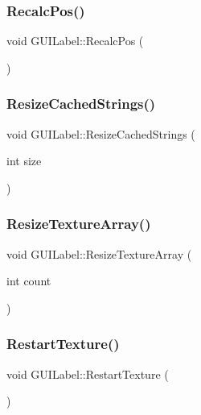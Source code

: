 \subsubsection{\texorpdfstring{Recalc\+Pos()}{RecalcPos()}}
{\footnotesize\ttfamily void G\+U\+I\+Label\+::\+Recalc\+Pos (\begin{DoxyParamCaption}{ }\end{DoxyParamCaption})}

\hypertarget{class_g_u_i_label_a0ce7c11de53589c0e184861fe9b1a2cf}{}\label{class_g_u_i_label_a0ce7c11de53589c0e184861fe9b1a2cf} 
\subsubsection{\texorpdfstring{Resize\+Cached\+Strings()}{ResizeCachedStrings()}}
{\footnotesize\ttfamily void G\+U\+I\+Label\+::\+Resize\+Cached\+Strings (\begin{DoxyParamCaption}\item[{int}]{size }\end{DoxyParamCaption})}

\hypertarget{class_g_u_i_label_ac11cef03c8fd58828868ed879fe81790}{}\label{class_g_u_i_label_ac11cef03c8fd58828868ed879fe81790} 
\subsubsection{\texorpdfstring{Resize\+Texture\+Array()}{ResizeTextureArray()}}
{\footnotesize\ttfamily void G\+U\+I\+Label\+::\+Resize\+Texture\+Array (\begin{DoxyParamCaption}\item[{int}]{count }\end{DoxyParamCaption})}

\hypertarget{class_g_u_i_label_a74e600e9ee18055cbe8e14672df2e909}{}\label{class_g_u_i_label_a74e600e9ee18055cbe8e14672df2e909} 
\subsubsection{\texorpdfstring{Restart\+Texture()}{RestartTexture()}}
{\footnotesize\ttfamily void G\+U\+I\+Label\+::\+Restart\+Texture (\begin{DoxyParamCaption}{ }\end{DoxyParamCaption})}


